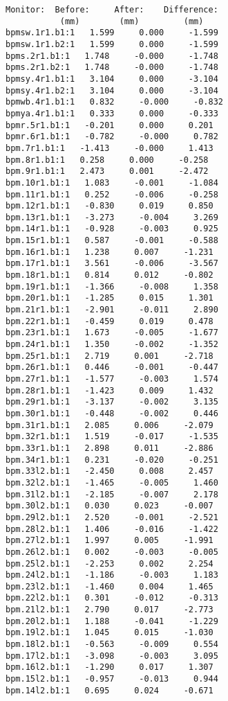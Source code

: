 \begin{verbatim}
Monitor:  Before:     After:    Difference:
           (mm)        (mm)         (mm)   
bpmsw.1r1.b1:1   1.599     0.000     -1.599
bpmsw.1r1.b2:1   1.599     0.000     -1.599
bpms.2r1.b1:1   1.748     -0.000     -1.748
bpms.2r1.b2:1   1.748     -0.000     -1.748
bpmsy.4r1.b1:1   3.104     0.000     -3.104
bpmsy.4r1.b2:1   3.104     0.000     -3.104
bpmwb.4r1.b1:1   0.832     -0.000     -0.832
bpmya.4r1.b1:1   0.333     0.000     -0.333
bpmr.5r1.b1:1   -0.201     0.000     0.201
bpmr.6r1.b1:1   -0.782     -0.000     0.782
bpm.7r1.b1:1   -1.413     -0.000     1.413
bpm.8r1.b1:1   0.258     0.000     -0.258
bpm.9r1.b1:1   2.473     0.001     -2.472
bpm.10r1.b1:1   1.083     -0.001     -1.084
bpm.11r1.b1:1   0.252     -0.006     -0.258
bpm.12r1.b1:1   -0.830     0.019     0.850
bpm.13r1.b1:1   -3.273     -0.004     3.269
bpm.14r1.b1:1   -0.928     -0.003     0.925
bpm.15r1.b1:1   0.587     -0.001     -0.588
bpm.16r1.b1:1   1.238     0.007     -1.231
bpm.17r1.b1:1   3.561     -0.006     -3.567
bpm.18r1.b1:1   0.814     0.012     -0.802
bpm.19r1.b1:1   -1.366     -0.008     1.358
bpm.20r1.b1:1   -1.285     0.015     1.301
bpm.21r1.b1:1   -2.901     -0.011     2.890
bpm.22r1.b1:1   -0.459     0.019     0.478
bpm.23r1.b1:1   1.673     -0.005     -1.677
bpm.24r1.b1:1   1.350     -0.002     -1.352
bpm.25r1.b1:1   2.719     0.001     -2.718
bpm.26r1.b1:1   0.446     -0.001     -0.447
bpm.27r1.b1:1   -1.577     -0.003     1.574
bpm.28r1.b1:1   -1.423     0.009     1.432
bpm.29r1.b1:1   -3.137     -0.002     3.135
bpm.30r1.b1:1   -0.448     -0.002     0.446
bpm.31r1.b1:1   2.085     0.006     -2.079
bpm.32r1.b1:1   1.519     -0.017     -1.535
bpm.33r1.b1:1   2.898     0.011     -2.886
bpm.34r1.b1:1   0.231     -0.020     -0.251
bpm.33l2.b1:1   -2.450     0.008     2.457
bpm.32l2.b1:1   -1.465     -0.005     1.460
bpm.31l2.b1:1   -2.185     -0.007     2.178
bpm.30l2.b1:1   0.030     0.023     -0.007
bpm.29l2.b1:1   2.520     -0.001     -2.521
bpm.28l2.b1:1   1.406     -0.016     -1.422
bpm.27l2.b1:1   1.997     0.005     -1.991
bpm.26l2.b1:1   0.002     -0.003     -0.005
bpm.25l2.b1:1   -2.253     0.002     2.254
bpm.24l2.b1:1   -1.186     -0.003     1.183
bpm.23l2.b1:1   -1.460     0.004     1.465
bpm.22l2.b1:1   0.301     -0.012     -0.313
bpm.21l2.b1:1   2.790     0.017     -2.773
bpm.20l2.b1:1   1.188     -0.041     -1.229
bpm.19l2.b1:1   1.045     0.015     -1.030
bpm.18l2.b1:1   -0.563     -0.009     0.554
bpm.17l2.b1:1   -3.098     -0.003     3.095
bpm.16l2.b1:1   -1.290     0.017     1.307
bpm.15l2.b1:1   -0.957     -0.013     0.944
bpm.14l2.b1:1   0.695     0.024     -0.671

\end{verbatim}
